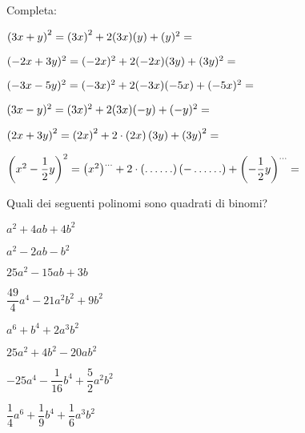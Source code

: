 
\subsubsection*{}

\begin{esercizio}
 \label{ese:11.1}
Completa:

\begin{enumeratea}
\item \( \left( 3x + y\right)^{2} = \left(3x\right)^{2} + 2(3x)(y) + (y) ^{2} = 
\dotfill~\)
\item \( (-2x + 3y)^{2} = (-2x)^{2} + 2(-2x)(3y) +(3y)^{2} = \dotfill~\)
\item \((-3x -5y)^{2} = (-3x)^{2} + 2(-3x)(-5x)+(-5x)^{2}= \dotfill~\)
\item \((3x - y)^{2} = (3x)^{2} +2(3x)(-y) + (-y)^{2} = \dotfill~\)
\item 
\(\left(2x+3y\right)^{2}=\left(2x\right)^{2}
+2\cdot\left(2x\right)\left(3y\right)+\left(3y\right)^{2}=\dotfill\)
\item \(\left(x^{2}-\dfrac{1}{2}y\right)^{2}=\left(x^{2}\right)^{\ldots}+2\cdot%
\left(\ldots \ldots \right)\left(-\ldots \ldots%
\right)+\left(-{\dfrac{1}{2}}y\right)^{\ldots }=\dotfill~\)
\end{enumeratea}
\end{esercizio}


\begin{esercizio}
 \label{ese:11.2}
Quali dei seguenti polinomi sono quadrati di binomi?

\begin{multicols}{2}
\TabPositions{4cm}
\begin{enumeratea}
\spazielenx
\item \(a^{2}+4{ab}+4b^{2}\) \tab\boxSi\quad\boxNo
\item \(a^{2}-2{ab}-b^{2}\) \tab\boxSi\quad\boxNo
\item \(25a^{2}-15{ab}+3b\) \tab\boxSi\quad\boxNo
\item \(\dfrac{49}{4}a^{4}-21a^{2}b^{2}+9b^{2}\) \tab\boxSi\quad\boxNo
\item \(a^{6}+b^{4}+2a^{3}b^{2}\) \tab\boxSi\quad\boxNo
\item \(25a^{2}+4b^{2}-20{ab}^{2}\) \tab\boxSi\quad\boxNo
\item \(-25a^{4}-\dfrac{1}{16}b^{4}+\dfrac{5}{2}a^{2}b^{2}\) \tab\boxSi\quad\boxNo
\item \(\dfrac{1}{4}a^{6}+\dfrac{1}{9}b^{4}+\dfrac{1}{6}a^{3}b^{2}\) 
\tab\boxSi\quad\boxNo
\end{enumeratea}
\end{multicols}
\end{esercizio}

